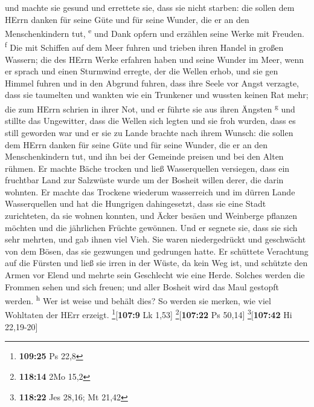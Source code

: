 und machte sie gesund und errettete sie, dass sie nicht starben:
 die sollen dem HErrn danken für seine Güte und für seine
Wunder, die er an den Menschenkindern tut, \textsuperscript{e}
 und Dank opfern und erzählen seine Werke mit Freuden.
\textsuperscript{f}  Die mit Schiffen auf dem Meer fuhren
und trieben ihren Handel in großen Wassern;  die des
HErrn Werke erfahren haben und seine Wunder im Meer, 
wenn er sprach und einen Sturmwind erregte, der die Wellen erhob,
 und sie gen Himmel fuhren und in den Abgrund fuhren,
dass ihre Seele vor Angst verzagte,  dass sie taumelten
und wankten wie ein Trunkener und wussten keinen Rat mehr;
 die zum HErrn schrien in ihrer Not, und er führte sie
aus ihren Ängsten \textsuperscript{g}  und stillte das
Ungewitter, dass die Wellen sich legten  und sie froh
wurden, dass es still geworden war und er sie zu Lande brachte nach
ihrem Wunsch:  die sollen dem HErrn danken für seine Güte
und für seine Wunder, die er an den Menschenkindern tut, 
und ihn bei der Gemeinde preisen und bei den Alten rühmen.
 Er machte Bäche trocken und ließ Wasserquellen
versiegen,  dass ein fruchtbar Land zur Salzwüste wurde
um der Bosheit willen derer, die darin wohnten.  Er
machte das Trockene wiederum wasserreich und im dürren Lande
Wasserquellen  und hat die Hungrigen dahingesetzt, dass
sie eine Stadt zurichteten, da sie wohnen konnten,  und
Äcker besäen und Weinberge pflanzen möchten und die jährlichen Früchte
gewönnen.  Und er segnete sie, dass sie sich sehr
mehrten, und gab ihnen viel Vieh.  Sie waren
niedergedrückt und geschwächt von dem Bösen, das sie gezwungen und
gedrungen hatte.  Er schüttete Verachtung auf die Fürsten
und ließ sie irren in der Wüste, da kein Weg ist,  und
schützte den Armen vor Elend und mehrte sein Geschlecht wie eine Herde.
 Solches werden die Frommen sehen und sich freuen; und
aller Bosheit wird das Maul gestopft werden. \textsuperscript{h}
 Wer ist weise und behält dies? So werden sie merken, wie
viel Wohltaten der HErr erzeigt. \footnote{\textbf{109:25} Ps 22,8}{[}\textbf{107:9}
Lk 1,53{]} \footnote{\textbf{118:14} 2Mo 15,2}{[}\textbf{107:22} Ps
50,14{]} \footnote{\textbf{118:22} Jes 28,16; Mt 21,42}{[}\textbf{107:42}
Hi 22,19-20{]}

